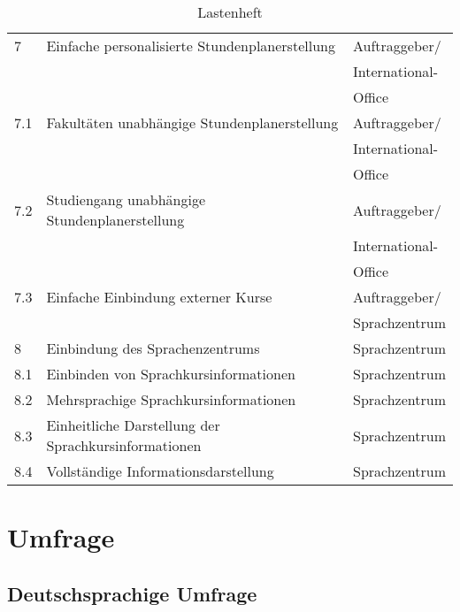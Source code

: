 \begin{table}[H]
\begin{center}
\begin{tabular}{| l | l | l |}
\hline    
\rowcolor{LGray} 						
7		& Einfache personalisierte Stundenplanerstellung	& Auftraggeber/		\\ \rowcolor{LGray}
		&													& International-	\\ \rowcolor{LGray}
		&													& Office			\\
\hline
7.1		& Fakultäten unabhängige Stundenplanerstellung		& Auftraggeber/		\\
		&													& International-	\\
		&													& Office 			\\ 
\hline
7.2		& Studiengang unabhängige Stundenplanerstellung		& Auftraggeber/		\\
		&													& International-	\\
		&													& Office			\\
\hline
7.3		& Einfache Einbindung externer Kurse				& Auftraggeber/		\\
		&													& Sprachzentrum	\\
\hline    
\rowcolor{LGray} 						
8		& Einbindung des Sprachenzentrums 						& Sprachzentrum \\
\hline
8.1		& Einbinden von Sprachkursinformationen					& Sprachzentrum \\
\hline
8.2		& Mehrsprachige Sprachkursinformationen					& Sprachzentrum \\
\hline
8.3		& Einheitliche Darstellung der Sprachkursinformationen	& Sprachzentrum \\
\hline
8.4		& Vollständige Informationsdarstellung					& Sprachzentrum \\
\hline

  \end{tabular}
  \end{center}
\caption[Lastenheft]{Lastenheft}
\label{tab:lastenheft}
\end{table}

\section*{Umfrage}

\subsection*{Deutschsprachige Umfrage}

